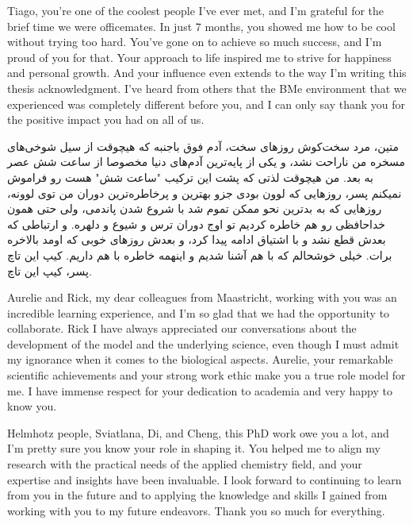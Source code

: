 Tiago, you're one of the coolest people I've ever met, and I'm grateful for the brief time we were officemates. In just 7 months, you showed me how to be cool without trying too hard. You've gone on to achieve so much success, and I'm proud of you for that. Your approach to life inspired me to strive for happiness and personal growth. And your influence even extends to the way I'm writing this thesis acknowledgment. I've heard from others that the BMe environment that we experienced was completely different before you, and I can only say thank you for the positive impact you had on all of us.

\begin{flushright}
\foreignlanguage{persian}
{
متین، مرد سخت‌کوش روزهای سخت، آدم فوق باجنبه که هیچوقت از سیل شوخی‌های مسخره من ناراحت نشد، و یکی از پایه‌ترین آدم‌های دنیا مخصوصا از ساعت شش عصر به بعد. من هیچوقت لذتی که پشت این ترکیب "ساعت شش" هست رو فراموش نمیکنم پسر، روزهایی که لوون بودی جزو بهترین و پرخاطره‌ترین دوران من توی لوونه، روزهایی که به بدترین نحو ممکن تموم شد با شروع شدن پاندمی، ولی حتی همون خداحافظی رو هم خاطره کردیم تو اوج دوران ترس و شیوع و دلهره. و ارتباطی که بعدش قطع نشد و با اشتیاق ادامه پیدا کرد، و بعدش روزهای خوبی که اومد بالاخره برات. خیلی خوشحالم که با هم آشنا شدیم و اینهمه خاطره با هم داریم. کیپ این تاچ پسر، کیپ این تاچ.
}
\end{flushright}

Aurelie and Rick, my dear colleagues from Maastricht, working with you was an incredible learning experience, and I'm so glad that we had the opportunity to collaborate. Rick I have always appreciated our conversations about the development of the model and the underlying science, even though I must admit my ignorance when it comes to the biological aspects. Aurelie, your remarkable scientific achievements and your strong work ethic make you a true role model for me. I have immense respect for your dedication to academia and very happy to know you.

Helmhotz people, Sviatlana, Di, and Cheng, this PhD work owe you a lot, and I’m pretty sure you know your role in shaping it. You helped me to align my research with the practical needs of the applied chemistry field, and your expertise and insights have been invaluable. I look forward to continuing to learn from you in the future and to applying the knowledge and skills I gained from working with you to my future endeavors. Thank you so much for everything.

